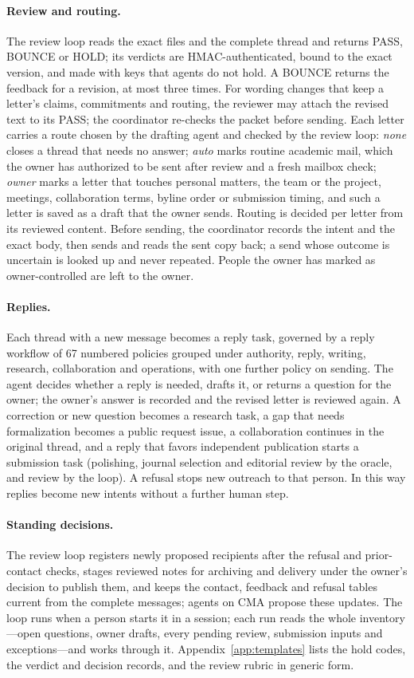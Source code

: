 \documentclass[11pt]{article}
\begin{document}
\paragraph{Review and routing.} The review loop reads the exact files and the
complete thread and returns PASS, BOUNCE or HOLD; its verdicts are
HMAC-authenticated, bound to the exact version, and made with keys that
agents do not hold. A BOUNCE returns the feedback for a revision, at most
three times. For wording changes that keep a letter's claims, commitments and
routing, the reviewer may attach the revised text to its PASS; the
coordinator re-checks the packet before sending. Each letter carries a route
chosen by the drafting agent and checked by the review loop: \emph{none}
closes a thread that needs no answer; \emph{auto} marks routine academic
mail, which the owner has authorized to be sent after review and a fresh
mailbox check; \emph{owner} marks a letter that touches personal matters, the
team or the project, meetings, collaboration terms, byline order or
submission timing, and such a letter is saved as a draft that the owner
sends. Routing is decided per letter from its reviewed content. Before
sending, the coordinator records the intent and the exact body, then sends
and reads the sent copy back; a send whose outcome is uncertain is looked up
and never repeated. People the owner has marked as owner-controlled are left
to the owner.

\paragraph{Replies.} Each thread with a new message becomes a reply task,
governed by a reply workflow of 67 numbered policies grouped under authority,
reply, writing, research, collaboration and operations, with one further
policy on sending. The agent
decides whether a reply is needed, drafts it, or returns a question for the
owner; the owner's answer is recorded and the revised letter is reviewed
again. A correction or new question becomes a research task, a gap that
needs formalization becomes a public request issue, a collaboration continues
in the original thread, and a reply that favors independent publication
starts a submission task (polishing, journal selection and editorial review
by the oracle, and review by the loop). A refusal stops new outreach to that
person. In this way replies become new intents without a further human step.

\paragraph{Standing decisions.} The review loop registers newly proposed
recipients after the refusal and prior-contact checks, stages reviewed notes
for archiving and delivery under the owner's decision to publish them, and
keeps the contact, feedback and refusal tables current from the complete
messages; agents on CMA propose these updates. The loop runs when a person
starts it in a session; each run reads the whole inventory---open questions,
owner drafts, every pending review, submission inputs and exceptions---and
works through it. Appendix~\ref{app:templates} lists the hold codes, the
verdict and decision records, and the review rubric in generic form.
\end{document}

